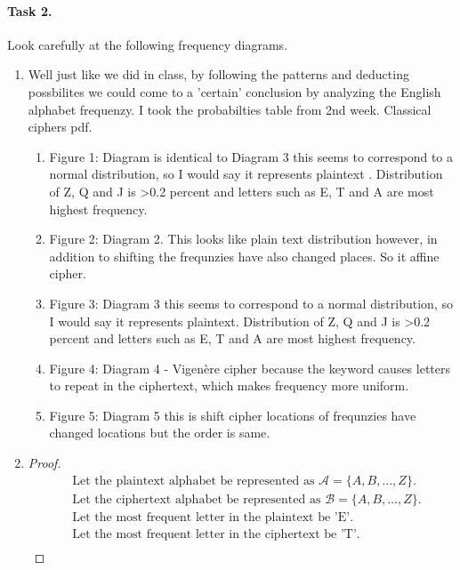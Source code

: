 \documentclass{article}
\begin{document}
\paragraph{Task 2.} Look carefully at the following frequency diagrams.
\begin{enumerate}
    \item Well just like we did in class, by following the patterns and deducting possbilites we could come to a 'certain' conclusion by
    analyzing the English alphabet frequenzy. I took the probabilties table from 2nd week. Classical ciphers pdf.
    \begin{enumerate}
            \item Figure 1: Diagram is identical to Diagram 3 this seems to correspond to a normal distribution, so I would say it
            represents plaintext . Distribution
            of Z, Q and J is >0.2 percent and letters such as E, T and A are most highest frequency.
            \item Figure 2: Diagram 2. This looks like plain text distribution however, in addition to shifting the frequnzies have also
            changed places. So it affine cipher.
      \item Figure 3: Diagram 3 this seems to correspond to a normal distribution, so I would say it represents plaintext. Distribution
            of Z, Q and J is >0.2 percent and letters such as E, T and A are most highest frequency.
      \item Figure 4: Diagram 4 -  Vigenère cipher because the keyword causes letters to repeat in the ciphertext, which makes frequency
            more uniform.
      \item Figure 5: Diagram 5 this is shift cipher locations of
            frequnzies have changed locations but the order is same.
    \end{enumerate}
    \item\begin{minipage}{\linewidth}
          \begin{proof}
            \begin{align*}
              &\text{Let the plaintext alphabet be represented as } \mathcal{A} = \{A, B, \ldots, Z\}. \\
              &\text{Let the ciphertext alphabet be represented as } \mathcal{B} = \{A, B, \ldots, Z\}. \\
              &\text{Let the most frequent letter in the plaintext be 'E'.} \\
              &\text{Let the most frequent letter in the ciphertext be 'T'.} \\

\end{align*}
\end{proof}
\end{minipage}
\end{enumerate}
\end{document}
